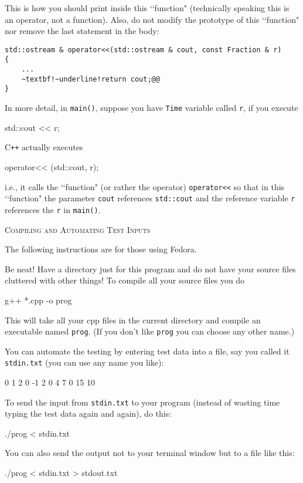 This is how you should print inside this \lq\lq function" (technically speaking
this is an operator, not a function). Also, do not modify the prototype of this
\lq\lq function" nor remove the last statement in the body:
\begin{Verbatim}[frame=single, commandchars=~!@]
std::ostream & operator<<(std::ostream & cout, const Fraction & r)
{
    ...
    ~textbf!~underline!return cout;@@
}
\end{Verbatim}

In more detail, in \verb!main()!, suppose you have \verb!Time! variable called
\verb!r!, if you execute
\begin{console}
std::cout << r;
\end{console}
C\texttt{++} actually executes
\begin{console}
operator<< (std::cout, r);
\end{console}
i.e., it calls the \lq\lq function" (or rather the operator) \verb!operator<<!
so that in this \lq\lq function" the parameter \verb!cout! references
\verb!std::cout! and the reference variable \verb!r! references the \verb!r! in
\verb!main()!.

\newpage
\textsc{Compiling and Automating Test Inputs}

The following instructions are for those using Fedora.

Be neat! Have a directory just for this program and do not have your source
files cluttered with other things! To compile all your source files you do
\begin{console}
g++ *.cpp -o prog
\end{console}

This will take all your cpp files in the current directory and compile an
executable named \verb!prog!. (If you don't like \verb!prog! you can
choose any other name.)

You can automate the testing by entering test data into a file, say you called
it \verb!stdin.txt! (you can use any name you like):
\begin{console}
0 1 2
0 -1 2
0 4 7
0 15 10
\end{console}

To send the input from \verb!stdin.txt! to your program (instead of wasting
time typing the test data again and again), do this:
\begin{console}
./prog < stdin.txt
\end{console}

You can also send the output not to your terminal window but to a file like
this:
\begin{console}
./prog < stdin.txt > stdout.txt
\end{console}

